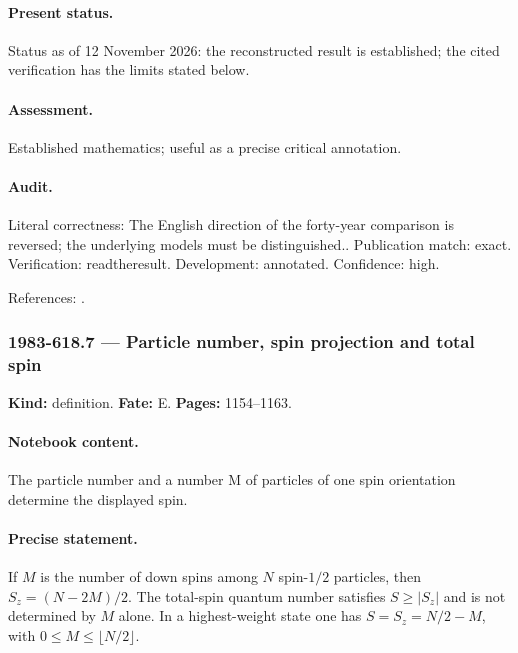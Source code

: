 \paragraph{Present status.} Status as of 12 November 2026: the reconstructed result is established; the cited verification has the limits stated below.

\paragraph{Assessment.} Established mathematics; useful as a precise critical annotation.

\paragraph{Audit.} Literal correctness: The English direction of the forty-year comparison is reversed; the underlying models must be distinguished.. Publication match: exact. Verification: readtheresult. Development: annotated. Confidence: high.

\noindent References: \citep{bethe1931metalle,zakharovshabat1972nls,yang1967manybody,sklyaninfaddeev1978quantum}.\par

\subsubsection{1983-618.7 --- Particle number, spin projection and total spin}

\label{item:1983-618.7}

\noindent\textbf{Kind:} definition. \textbf{Fate:} E. \textbf{Pages:} 1154--1163.\par

\paragraph{Notebook content.} The particle number and a number M of particles of one spin orientation determine the displayed spin.

\paragraph{Precise statement.} If $M$ is the number of down spins among $N$ spin-$1/2$ particles, then $S_z=(N-2M)/2$. The total-spin quantum number satisfies $S\geq |S_z|$ and is not determined by $M$ alone. In a highest-weight state one has $S=S_z=N/2-M$, with $0\leq M\leq\lfloor N/2\rfloor$.


